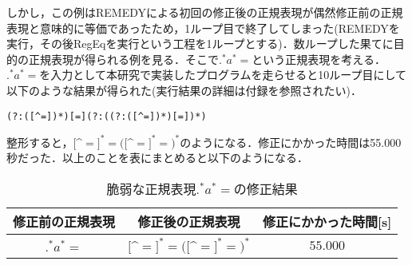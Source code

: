 \documentclass[a4paper, 12pt, dvipdfmx, uplatex]{jsreport}
\begin{document}
しかし，この例はREMEDYによる初回の修正後の正規表現が偶然修正前の正規表現と意味的に等価であったため，1ループ目で終了してしまった(REMEDYを実行，その後RegEqを実行という工程を1ループとする)．数ループした果てに目的の正規表現が得られる例を見る．そこで$.^*a^*\mathrm{=}$という正規表現を考える．$.^*a^*\mathrm{=}$を入力として本研究で実装したプログラムを走らせると10ループ目にして以下のような結果が得られた(実行結果の詳細は付録を参照されたい)．

\begin{lstlisting}[caption=$.^*a^*\mathrm{=}$を非脆弱化した正規表現,label=number]
(?:([^=])*)[=](?:((?:([^=])*)[=])*)
\end{lstlisting}

整形すると，$[$^$\mathrm{=}]^*\mathrm{=}([$^$\mathrm{=}]^*\mathrm{=})^*$のようになる．修正にかかった時間は55.000秒だった．以上のことを表にまとめると以下のようになる．

\begin{table}[H]
  \centering
  \caption{脆弱な正規表現$.^*a^*\mathrm{=}$の修正結果\label{vul_res2}}
  \begin{tabular}{c|c|c} \hline \hline
      修正前の正規表現 & 修正後の正規表現  & 修正にかかった時間[s]\\\hline
      $.^*a^*\mathrm{=}$  & $[$^$\mathrm{=}]^*\mathrm{=}([$^$\mathrm{=}]^*\mathrm{=})^*$ &$55.000$ \\\hline
  \end{tabular}
\end{table}






% 
% 
\end{document}
